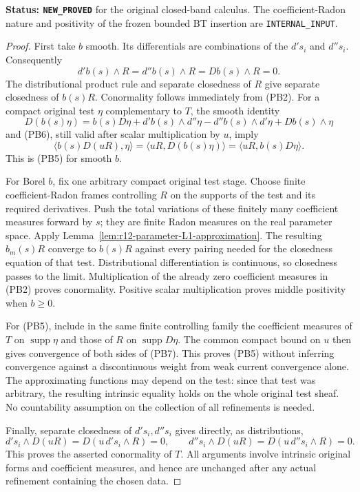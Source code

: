 \documentclass[11pt,a4paper]{article}
\numberwithin{equation}{section}
\theoremstyle{definition}
\theoremstyle{remark}
\begin{document}
\noindent\textbf{Status: \texttt{NEW\_PROVED}} for the original
closed-band calculus. The coefficient-Radon nature and positivity of
the frozen bounded BT insertion are \texttt{INTERNAL\_INPUT}.

\begin{proof}
First take $b$ smooth. Its differentials are combinations of the
$d's_i$ and $d''s_i$. Consequently
\[
 d'b(s)\wedge R=d''b(s)\wedge R=Db(s)\wedge R=0.
 \tag{PB6}
\]
The distributional product rule and separate closedness of $R$
give separate closedness of $b(s)R$. Conormality follows immediately
from (PB2). For a compact original test $\eta$ complementary to $T$,
the smooth identity
\[
 D(b(s)\eta)=b(s)D\eta+d'b(s)\wedge d''\eta
                    -d''b(s)\wedge d'\eta+Db(s)\wedge\eta
\]
and (PB6), still valid after scalar multiplication by $u$, imply
\[
 \langle b(s)D(uR),\eta\rangle
   =\langle uR,D(b(s)\eta)\rangle
   =\langle uR,b(s)D\eta\rangle.
 \tag{PB7}
\]
This is (PB5) for smooth $b$.

For Borel $b$, fix one arbitrary compact original test stage. Choose
finite coefficient-Radon frames controlling $R$ on the supports of
the test and its required derivatives. Push the total variations of
these finitely many coefficient measures forward by $s$; they are
finite Radon measures on the real parameter space. Apply
Lemma~\ref{lem:r12-parameter-L1-approximation}. The resulting
$b_m(s)R$ converge to $b(s)R$ against every pairing needed for the
closedness equation of that test. Distributional differentiation is
continuous, so closedness passes to the limit. Multiplication of the
already zero coefficient measures in (PB2) proves conormality.
Positive scalar multiplication proves middle positivity when $b\ge0$.

For (PB5), include in the same finite controlling family the
coefficient measures of $T$ on $\operatorname{supp}\eta$ and those
of $R$ on $\operatorname{supp}D\eta$. The common compact bound on
$u$ then gives convergence of both sides of (PB7). This proves
(PB5) without inferring convergence against a discontinuous weight
from weak current convergence alone. The approximating functions
may depend on the test: since that test was arbitrary, the resulting
intrinsic equality holds on the whole original test sheaf. No
countability assumption on the collection of all refinements is
needed.

Finally, separate closedness of $d's_i,d''s_i$ gives directly, as
distributions,
\[
 d's_i\wedge D(uR)=D(u\,d's_i\wedge R)=0,
 \qquad
 d''s_i\wedge D(uR)=D(u\,d''s_i\wedge R)=0.
 \tag{PB8}
\]
This proves the asserted conormality of $T$. All arguments involve
intrinsic original forms and coefficient measures, and hence are
unchanged after any actual refinement containing the chosen data.
\end{proof}
\end{document}
